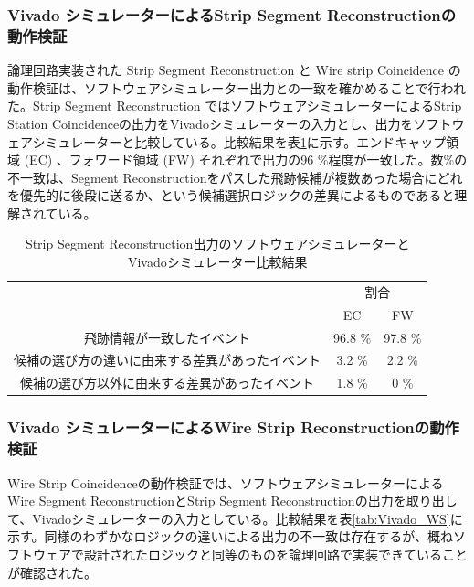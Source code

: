 \subsubsection*{Vivado シミュレーターによるStrip Segment Reconstructionの動作検証}

論理回路実装された Strip Segment Reconstruction と Wire strip Coincidence の動作検証は、ソフトウェアシミュレーター出力との一致を確かめることで行われた。Strip Segment Reconstruction ではソフトウェアシミュレーターによるStrip Station Coincidenceの出力をVivadoシミュレーターの入力とし、出力をソフトウェアシミュレーターと比較している。比較結果を表\ref{tab:Vivado_strip}に示す。エンドキャップ領域 (EC) 、フォワード領域 (FW) それぞれで出力の96 \%程度が一致した。数\%の不一致は、Segment Reconstructionをパスした飛跡候補が複数あった場合にどれを優先的に後段に送るか、という候補選択ロジックの差異によるものであると理解されている。

\begin{table}[]
    \centering
    \caption{Strip Segment Reconstruction出力のソフトウェアシミュレーターとVivadoシミュレーター比較結果}
    \label{tab:Vivado_strip}
    \begin{tabular}{|c|cc|}
    \hline
    \multirow{2}{*}{}        & \multicolumn{2}{c|}{割合}                \\ \cline{2-3} 
                             & \multicolumn{1}{c|}{EC}      & FW      \\ \hline\hline
    飛跡情報が一致したイベント            & \multicolumn{1}{c|}{96.8 \%} & 97.8 \% \\ \hline
    候補の選び方の違いに由来する差異があったイベント & \multicolumn{1}{c|}{3.2 \%}  & 2.2 \%  \\ \hline
    候補の選び方以外に由来する差異があったイベント  & \multicolumn{1}{c|}{1.8 \%}  & 0 \%    \\ \hline
    \end{tabular}
\end{table}



\subsubsection*{Vivado シミュレーターによるWire Strip Reconstructionの動作検証}
Wire Strip Coincidenceの動作検証では、ソフトウェアシミュレーターによるWire Segment ReconstructionとStrip Segment Reconstructionの出力を取り出して、Vivadoシミュレーターの入力としている。比較結果を表\ref{tab:Vivado_WS}に示す。同様のわずかなロジックの違いによる出力の不一致は存在するが、概ねソフトウェアで設計されたロジックと同等のものを論理回路で実装できていることが確認された。


